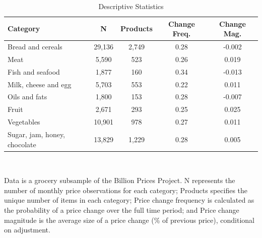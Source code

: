 \documentclass[11pt]{article}
\begin{document}
\begin{table}[hb]
    \centering
\caption{Descriptive Statistics}
    \begin{tabular}{l | c  c  c  c } 
 \hline
  \textbf{Category} & \textbf{N} & \textbf{Products} & \textbf{Change Freq.} & \textbf{Change Mag.} \\ [0.2ex] 
 \hline\hline
 Bread and cereals & 29,136 & 2,749 & 0.28 & -0.002  \\
  Meat & 5,590  & 523 & 0.26  & 0.019\\
  Fish and seafood & 1,877  & 160 & 0.34 & -0.013  \\
  Milk, cheese and egg & 5,703  & 553 & 0.22 & 0.011   \\
  Oils and fats & 1,800 & 153 & 0.28 & -0.007   \\
  Fruit & 2,671  & 293 & 0.25 & 0.025   \\
  Vegetables & 10,901  & 978 &  0.27 & 0.011  \\
  Sugar, jam, honey, chocolate & 13,829  & 1,229 & 0.28 & 0.005 \\
   \hline
\end{tabular}
\vspace{1mm}
\\
\begin{tablenotes}\footnotesize
\item Data is a grocery subsample of the Billion Prices Project. N represents the number of monthly price observations for each category; Products specifies the unique number of items in each category; Price change frequency is calculated as the probability of a price change over the full time period; and Price change magnitude is the average size of a price change (\% of previous price), conditional on adjustment. 
\end{tablenotes}
\label{Table 2}
\end{table}
\end{document}
